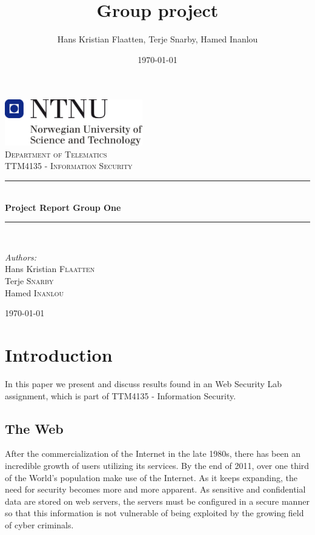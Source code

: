\documentclass[a4paper, 12pt]{article}
\title{Group project}
\author{Hans Kristian Flaatten, Terje Snarby, Hamed Inanlou }
\date{\today}
\begin{document}
\begin{titlepage}
\begin{center}
\includegraphics[width=0.45\textwidth]{./img/NTNU-logo.png}\\[5cm]
\textsc{\large Department of Telematics}\\[0.2cm]
\textsc{\Large TTM4135 - Information Security}\\[0.5cm]

\rule{\linewidth}{0.2mm} \\[0.4cm]
{ \LARGE \bfseries Project Report Group One}\\[0.2cm]
\rule{\linewidth}{0.2mm} \\[1.5cm]

\begin{minipage}{0.4\textwidth}
\begin{flushleft} \large
\emph{Authors:}\\
Hans Kristian \textsc{Flaatten}\\
Terje \textsc{Snarby}\\
Hamed \textsc{Inanlou}
\end{flushleft}
\end{minipage}

\vfill
{\large \today}
\end{center}
\end{titlepage}


\section{Introduction}
In this paper we present and discuss results found in an Web Security Lab assignment, which is part of TTM4135 - Information Security.

\subsection{The Web}
After the commercialization of the Internet in the late 1980s, there has been an incredible growth of users utilizing its services. By the end of 2011, over one third of the World’s population make use of the Internet\cite{net}. As it keeps expanding, the need for security becomes more and more apparent. As sensitive and confidential data are stored on web servers, the servers must be configured in a secure manner so that this information is not vulnerable of being exploited by the growing field of cyber criminals.
\end{document}
